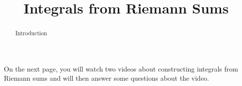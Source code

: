\documentclass[handout]{ximera}
\title{Integrals from Riemann Sums}
\begin{document}
\begin{abstract} Introduction %
\end{abstract}

\maketitle

On the next page, you will watch two videos about constructing integrals from Riemann sums and will then answer some questions about the video.

\end{document}
